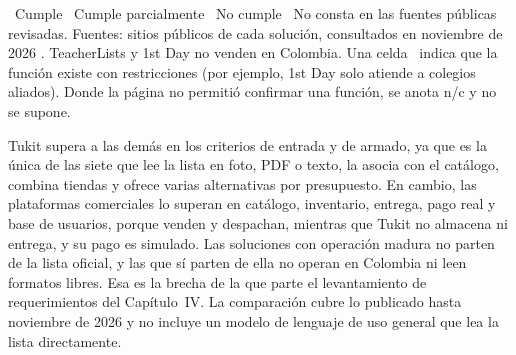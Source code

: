 \begin{table}[htbp]
\vspace{3pt}
\begin{minipage}{0.97\textwidth}
{\footnotesize \cumple\ Cumple \quad \parcial\ Cumple parcialmente \quad \nocumple\ No cumple \quad
\nc\ No consta en las fuentes públicas revisadas.
Fuentes: sitios públicos de cada solución, consultados en noviembre de 2026
\citep{teacherlists_retail_2026,firstday_faqs_2026,panamericana_cotizador_2025,exito_listas_2025,primavera_armatulista_2026,mercadolibre_kits_2025}.
TeacherLists y 1st Day no venden en Colombia. Una celda \parcial\ indica que la función existe con restricciones
(por ejemplo, 1st Day solo atiende a colegios aliados). Donde la página no permitió confirmar una función,
se anota n/c y no se supone.}
\end{minipage}
\end{table}

Tukit supera a las demás en los criterios de entrada y de armado, ya que es la única de las siete que lee la lista en foto, PDF o
texto, la asocia con el catálogo, combina tiendas y ofrece varias alternativas por presupuesto. En cambio, las
plataformas comerciales lo superan en catálogo, inventario, entrega, pago real y base de usuarios, porque venden
y despachan, mientras que Tukit no almacena ni entrega, y su pago es simulado. Las soluciones con operación madura no
parten de la lista oficial, y las que sí parten de ella no operan en Colombia ni leen formatos libres. Esa es la
brecha de la que parte el levantamiento de requerimientos del Capítulo~IV. La comparación cubre lo publicado hasta noviembre de 2026 y no incluye un modelo de lenguaje de uso general que lea la lista directamente.\par
